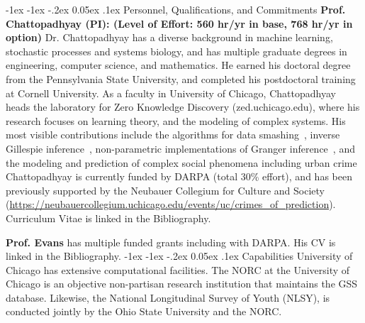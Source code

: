 \documentclass[onecolumn, compsoc,11pt]{IEEEtran}
\makeatletter
\renewcommand\section{\@startsection {section}{1}{\z@}%
                                   {-1ex \@plus -1ex \@minus -.2ex}%
                                   {0.05ex \@plus.1ex}%
                                   {\large\bfseries\scshape}}
\makeatother
\begin{document}
\section{Personnel, Qualifications, and Commitments}
\textbf{Prof. Chattopadhyay (PI): (Level of Effort: 560 hr/yr in base, 768 hr/yr in option) } 
Dr. Chattopadhyay has a diverse background in machine learning, stochastic processes and systems biology, and has multiple graduate degrees in engineering, computer science, and mathematics. He earned his doctoral degree from the Pennsylvania State University, and completed his postdoctoral training at Cornell University. As a faculty in University of Chicago, Chattopadhyay heads the laboratory for Zero Knowledge Discovery (zed.uchicago.edu), where his research focuses on learning theory, and the modeling of complex systems.  His most visible contributions include the algorithms for data smashing~\cite{Chattopadhyay20140826}, inverse Gillespie inference~\cite{Chattopadhyay12990},  non-parametric implementations of Granger  inference~\cite{DBLP:journals/corr/Chattopadhyay14}, and the modeling and prediction of complex social phenomena including urban crime~\cite{li2019longrange} Chattopadhyay is currently funded by DARPA (total 30\% effort), and has been previously supported by  the Neubauer Collegium for Culture and Society {\footnotesize (\href{https://neubauercollegium.uchicago.edu/events/uc/crimes\_of\_prediction/}{https://neubauercollegium.uchicago.edu/events/uc/crimes\_of\_prediction}}).
Curriculum Vitae is linked in the Bibliography.

\textbf{Prof. Evans} has multiple funded grants including with DARPA. His CV is linked in the Bibliography.
\section{Capabilities}
University of Chicago has extensive computational facilities. The NORC at the University of Chicago is an objective non-partisan research institution that maintains the GSS database. Likewise, the National Longitudinal Survey of Youth (NLSY), is  conducted jointly by the Ohio State University and the NORC.
%
\end{document}
